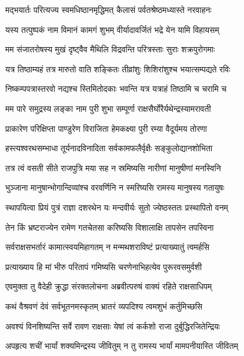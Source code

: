 \twolineshloka
{मद्भयार्तः परित्यज्य स्वमधिष्ठानमृद्धिमत्}
{कैलासं पर्वतश्रेष्ठमध्यास्ते नरवाहनः} %

\twolineshloka
{यस्य तत्पुष्पकं नाम विमानं कामगं शुभम्}
{वीर्यादावर्जितं भद्रे येन यामि विहायसम्} %

\twolineshloka
{मम संजातरोषस्य मुखं दृष्ट्वैव मैथिलि}
{विद्रवन्ति परित्रस्ताः सुराः शक्रपुरोगमाः} %

\twolineshloka
{यत्र तिष्ठाम्यहं तत्र मारुतो वाति शङ्कितः}
{तीव्रांशुः शिशिरांशुश्च भयात्सम्पद्यते रविः} %

\twolineshloka
{निष्कम्पपत्रास्तरवो नद्यश्च स्तिमितोदकाः}
{भवन्ति यत्र यत्राहं तिष्ठामि च चरामि च} %

\twolineshloka
{मम पारे समुद्रस्य लङ्का नाम पुरी शुभा}
{सम्पूर्णा राक्षसैर्घोरैर्यथेन्द्रस्यामरावती} %

\twolineshloka
{प्राकारेण परिक्षिप्ता पाण्डुरेण विराजिता}
{हेमकक्ष्या पुरी रम्या वैदूर्यमय तोरणा} %

\twolineshloka
{हस्त्यश्वरथसम्भाधा तूर्यनादविनादिता}
{सर्वकामफलैर्वृक्षैः सङ्कुलोद्यानशोभिता} %

\twolineshloka
{तत्र त्वं वसती सीते राजपुत्रि मया सह}
{न स्रमिष्यसि नारीणां मानुषीणां मनस्विनि} %

\twolineshloka
{भुञ्जाना मानुषान्भोगान्दिव्यांश्च वरवर्णिनि}
{न स्मरिष्यसि रामस्य मानुषस्य गतायुषः} %

\twolineshloka
{स्थापयित्वा प्रियं पुत्रं राज्ञा दशरथेन यः}
{मन्दवीर्यः सुतो ज्येष्ठस्ततः प्रस्थापितो वनम्} %

\twolineshloka
{तेन किं भ्रष्टराज्येन रामेण गतचेतसा}
{करिष्यसि विशालाक्षि तापसेन तपस्विना} %

\twolineshloka
{सर्वराक्षसभर्तारं कामात्स्वयमिहागतम्}
{न मन्मथशराविष्टं प्रत्याख्यातुं त्वमर्हसि} %

\twolineshloka
{प्रत्याख्याय हि मां भीरु परितापं गमिष्यसि}
{चरणेनाभिहत्येव पुरूरवसमुर्वशी} %

\twolineshloka
{एवमुक्ता तु वैदेही क्रुद्धा संरक्तलोचना}
{अब्रवीत्परुषं वाक्यं रहिते राक्षसाधिपम्} %

\twolineshloka
{कथं वैश्रवणं देवं सर्वभूतनमस्कृतम्}
{भ्रातरं व्यपदिश्य त्वमशुभं कर्तुमिच्छसि} %

\twolineshloka
{अवश्यं विनशिष्यन्ति सर्वे रावण राक्षसाः}
{येषां त्वं कर्कशो राजा दुर्बुद्धिरजितेन्द्रियः} %

\twolineshloka
{अपहृत्य शचीं भार्यां शक्यमिन्द्रस्य जीवितुम्}
{न तु रामस्य भार्यां मामपनीयास्ति जीवितम्} %

